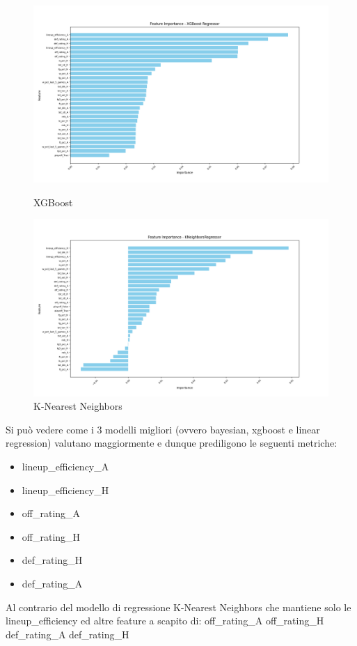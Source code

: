 \begin{figure}[H]
    \centering
    \begin{minipage}[b]{0.45\linewidth}
        \centering
        \includegraphics[width=\linewidth]{img/xgboost.png}
        \caption{XGBoost}
        \label{fig:first_label}
    \end{minipage}
    \hspace{0.05\linewidth}
    \begin{minipage}[b]{0.45\linewidth}
        \centering
        \includegraphics[width=\linewidth]{img/knn.png}
        \caption{K-Nearest Neighbors}
        \label{fig:second_label}
    \end{minipage}
\end{figure}

Si può vedere come i 3 modelli migliori (ovvero bayesian, xgboost e linear regression) valutano maggiormente e dunque prediligono le seguenti metriche:
\begin{itemize}
    \item lineup\_efficiency\_A
    \item lineup\_efficiency\_H
    \item off\_rating\_A
    \item off\_rating\_H
    \item def\_rating\_H
    \item def\_rating\_A
\end{itemize} 
Al contrario del modello di regressione K-Nearest Neighbors che mantiene solo le lineup\_efficiency ed altre feature a scapito di:
off\_rating\_A
off\_rating\_H
def\_rating\_A
def\_rating\_H

\newpage
